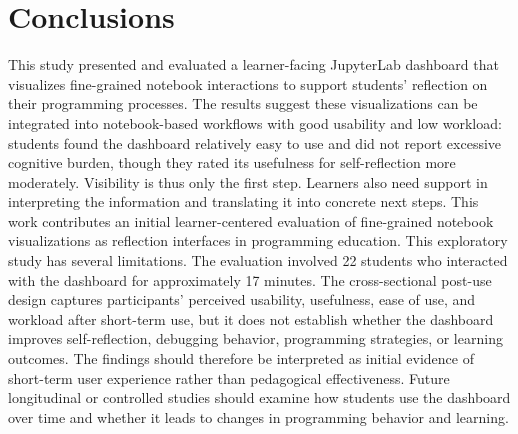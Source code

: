 \documentclass[sigconf]{acmart}
\begin{document}
\section{Conclusions}
This study presented and evaluated a learner-facing JupyterLab dashboard that visualizes fine-grained notebook interactions to support students' reflection on their programming processes. The results suggest these visualizations can be integrated into notebook-based workflows with good usability and low workload: students found the dashboard relatively easy to use and did not report excessive cognitive burden, though they rated its usefulness for self-reflection more moderately. Visibility is thus only the first step. Learners also need support in interpreting the information and translating it into concrete next steps. This work contributes an initial learner-centered evaluation of fine-grained notebook visualizations as reflection interfaces in programming education. This exploratory study has several limitations. The evaluation involved 22 students who interacted with the dashboard for approximately 17 minutes. The cross-sectional post-use design captures participants' perceived usability, usefulness, ease of use, and workload after short-term use, but it does not establish whether the dashboard improves self-reflection, debugging behavior, programming strategies, or learning outcomes. The findings should therefore be interpreted as initial evidence of short-term user experience rather than pedagogical effectiveness. Future longitudinal or controlled studies should examine how students use the dashboard over time and whether it leads to changes in programming behavior and learning.






\end{document}
